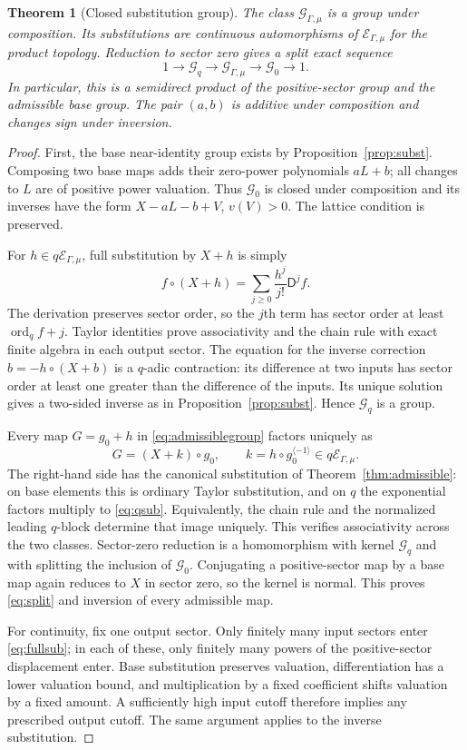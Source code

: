 \documentclass[11pt,a4paper]{article}
\newtheorem{theorem}{Theorem}[section]
\theoremstyle{definition}
\theoremstyle{remark}
\newcommand{\E}{\mathcal E_{\Gamma,\mu}}
\newcommand{\ordq}{\operatorname{ord}_q}
\newcommand{\rev}{^{\langle-1\rangle}}
\newcommand{\D}{\mathsf D}
\begin{document}
\begin{theorem}[Closed substitution group]\label{thm:group}
The class $\mathcal G_{\Gamma,\mu}$ is a group under composition. Its
substitutions are continuous automorphisms of $\E$ for the product topology.
Reduction to sector zero gives a split exact sequence
\begin{equation}\label{eq:split}
 1\longrightarrow\mathcal G_q\longrightarrow\mathcal G_{\Gamma,\mu}
 \longrightarrow\mathcal G_0\longrightarrow1.
\end{equation}
In particular, this is a semidirect product of the positive-sector group
and the admissible base group. The pair $(a,b)$ is additive under
composition and changes sign under inversion.
\end{theorem}
\begin{proof}
First, the base near-identity group exists by
Proposition~\ref{prop:subst}. Composing two base maps adds their
zero-power polynomials $aL+b$; all changes to $L$ are of positive power
valuation. Thus $\mathcal G_0$ is closed under composition and its inverses
have the form $X-aL-b+V$, $v(V)>0$. The lattice condition is preserved.

For $h\in q\E$, full substitution by $X+h$ is simply
\begin{equation}\label{eq:qTaylor}
 f\circ(X+h)=\sum_{j\ge0}\frac{h^j}{j!}\D^jf.
\end{equation}
The derivation preserves sector order, so the $j$th term has sector order
at least $\ordq f+j$. Taylor identities prove associativity and the chain
rule with exact finite algebra in each output sector. The equation for the
inverse correction $b=-h\circ(X+b)$ is a $q$-adic contraction: its difference
at two inputs has sector order at least one greater than the difference of
the inputs. Its unique solution gives a two-sided inverse as in
Proposition~\ref{prop:subst}. Hence $\mathcal G_q$ is a group.

Every map $G=g_0+h$ in \eqref{eq:admissiblegroup} factors uniquely as
\[
 G=(X+k)\circ g_0,\qquad k=h\circ g_0\rev\in q\E.
\]
The right-hand side has the canonical substitution of
Theorem~\ref{thm:admissible}: on base elements this is ordinary Taylor
substitution, and on $q$ the exponential factors multiply to
\eqref{eq:qsub}. Equivalently, the chain rule and the normalized leading
$q$-block determine that image uniquely. This verifies associativity across
the two classes. Sector-zero reduction is a homomorphism with kernel
$\mathcal G_q$ and with splitting the inclusion of $\mathcal G_0$.
Conjugating a positive-sector map by a base map again reduces to $X$ in
sector zero, so the kernel is normal. This proves \eqref{eq:split} and
inversion of every admissible map.

For continuity, fix one output sector. Only finitely many input sectors
enter \eqref{eq:fullsub}; in each of these, only finitely many powers of the
positive-sector displacement enter. Base substitution preserves valuation,
differentiation has a lower valuation bound, and multiplication by a fixed
coefficient shifts valuation by a fixed amount. A sufficiently high input
cutoff therefore implies any prescribed output cutoff. The same argument
applies to the inverse substitution.
\end{proof}
\end{document}
